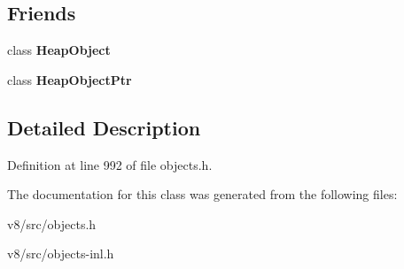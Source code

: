 \subsection*{Friends}
\begin{DoxyCompactItemize}
\item 
\mbox{\label{classv8_1_1internal_1_1MapWord_a4ae334d69f930be0e066fd52730366d3}} 
class {\bfseries Heap\+Object}
\item 
\mbox{\label{classv8_1_1internal_1_1MapWord_a510acddc5ade76a5260de8230047a40a}} 
class {\bfseries Heap\+Object\+Ptr}
\end{DoxyCompactItemize}


\subsection{Detailed Description}


Definition at line 992 of file objects.\+h.



The documentation for this class was generated from the following files\+:\begin{DoxyCompactItemize}
\item 
v8/src/objects.\+h\item 
v8/src/objects-\/inl.\+h\end{DoxyCompactItemize}
